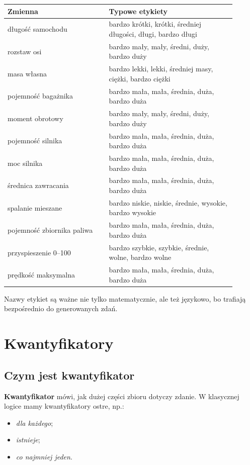 \documentclass[11pt,a4paper]{article}
\newcommand{\term}[1]{\textbf{#1}}
\begin{document}
\begin{longtable}{p{0.40\linewidth}p{0.50\linewidth}}
\toprule
\textbf{Zmienna} & \textbf{Typowe etykiety}\\
\midrule
\endhead
długość samochodu & bardzo krótki, krótki, średniej długości, długi, bardzo długi\\
rozstaw osi & bardzo mały, mały, średni, duży, bardzo duży\\
masa własna & bardzo lekki, lekki, średniej masy, ciężki, bardzo ciężki\\
pojemność bagażnika & bardzo mała, mała, średnia, duża, bardzo duża\\
moment obrotowy & bardzo mały, mały, średni, duży, bardzo duży\\
pojemność silnika & bardzo mała, mała, średnia, duża, bardzo duża\\
moc silnika & bardzo mała, mała, średnia, duża, bardzo duża\\
średnica zawracania & bardzo mała, mała, średnia, duża, bardzo duża\\
spalanie mieszane & bardzo niskie, niskie, średnie, wysokie, bardzo wysokie\\
pojemność zbiornika paliwa & bardzo mała, mała, średnia, duża, bardzo duża\\
przyspieszenie 0--100 & bardzo szybkie, szybkie, średnie, wolne, bardzo wolne\\
prędkość maksymalna & bardzo mała, mała, średnia, duża, bardzo duża\\
\bottomrule
\end{longtable}

Nazwy etykiet są ważne nie tylko matematycznie, ale też językowo, bo trafiają bezpośrednio do generowanych zdań.

\section{Kwantyfikatory}

\subsection{Czym jest kwantyfikator}

\term{Kwantyfikator} mówi, jak dużej części zbioru dotyczy zdanie. W klasycznej logice mamy kwantyfikatory ostre, np.:

\begin{itemize}
    \item \emph{dla każdego};
    \item \emph{istnieje};
    \item \emph{co najmniej jeden}.
\end{itemize}
\end{document}
